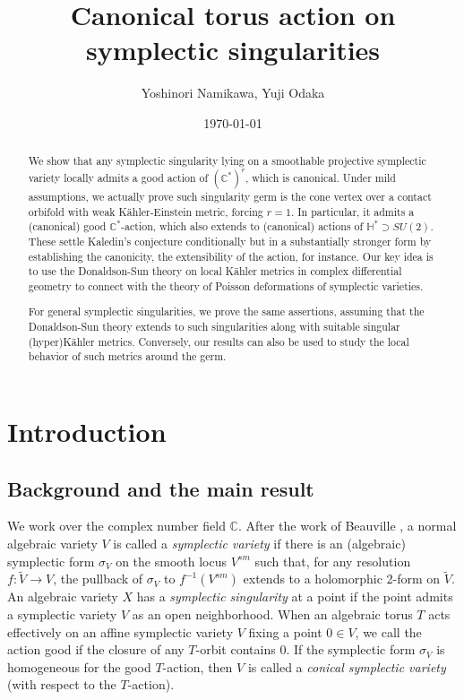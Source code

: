 \documentclass[12pt,a4paper]{amsart}
\theoremstyle{remark}
\theoremstyle{definition}
\def\C{\mathbb{C}}
\begin{document}

\title{Canonical torus action on symplectic singularities}
\author{Yoshinori Namikawa, Yuji Odaka}
\date{\today}
\maketitle
\thispagestyle{empty}

\begin{abstract}
We show that any symplectic singularity lying on a smoothable projective 
symplectic variety locally admits a good action of $(\C^*)^r$, which is 
canonical. 
Under mild assumptions, 
we actually prove such singularity germ is 
the cone vertex over a contact orbifold 
with weak K\"ahler-Einstein metric, forcing $r=1$. 
In particular, it admits a (canonical) 
good $\mathbb{C}^*$-action, which also 
extends to (canonical) actions of $\mathbb{H}^*\supset SU(2)$. 
These settle Kaledin's conjecture conditionally but in a substantially 
stronger form by establishing the canonicity, the extensibility of the 
action, for instance. 
Our key idea is to use the Donaldson-Sun theory 
on local K\"ahler metrics in complex differential geometry 
to connect with the theory of Poisson deformations of 
symplectic  varieties. 

For general symplectic singularities, 
we prove the same assertions, assuming that the Donaldson-Sun theory extends to such singularities along with suitable singular (hyper)K\"ahler metrics. 
Conversely, our results can also be used to study the local 
behavior of such metrics around the germ. 
\end{abstract}

\section{Introduction}

\subsection{Background and the main result}
We work over the complex number field $\C$. 
After the work of Beauville \cite{Beauville}, a normal algebraic variety $V$ is called a {\it symplectic variety} if 
there is an (algebraic)  symplectic form $\sigma_V$ on the 
smooth locus $V^{sm}$ such that, for any resolution $f: \tilde{V} \to V$, the pullback of $\sigma_V$ to $f^{-1}(V^{sm})$ extends to a 
holomorphic 2-form on $\tilde{V}$. An algebraic variety $X$ has a {\it symplectic singularity} at a point if the point admits a symplectic variety $V$ as an open neighborhood. When an algebraic torus $T$ acts effectively on an affine symplectic variety $V$ fixing a point $0 \in V$, we call the action good if the closure of any $T$-orbit contains $0$. If the symplectic form $\sigma_V$ is homogeneous for the good $T$-action, then $V$ is called a {\it conical symplectic variety} (with respect to the 
$T$-action). 
\end{document}
